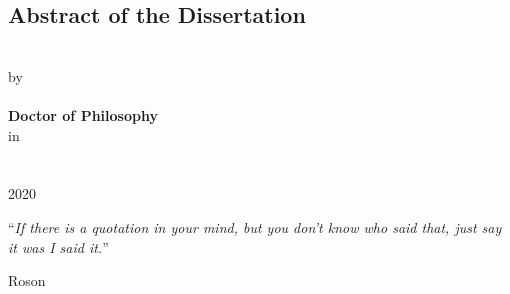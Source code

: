 \documentclass[
12pt, %
oneside, %
english, %
singlespacing, %
liststotoc, %
]{main} %
\begin{document}
\renewcommand{\abstractname}{Abstract of the Dissertation}
\begin{center}
	\section*{\abstractname}

		\textbf{\ttitle} \\ [0.5cm]
		by  \\ [0.5cm]
		\textbf{\authorname} \\ [0.5cm]
		\textbf{Doctor of Philosophy} \\ [0.5cm]
		in \\ [0.5cm]
		\textbf{\deptname}  \\ [0.5cm]
		\univname  \\ [0.5cm]
		2020  \\ [0.5cm]
\end{center}



\newpage



\vspace*{0.2\textheight}

\noindent\enquote{\itshape If there is a quotation in your mind, but you don't know who said that, just say it was I said it.}\bigbreak

\hfill Roson


\tableofcontents %

\listoffigures %

\listoftables %

\end{document}
